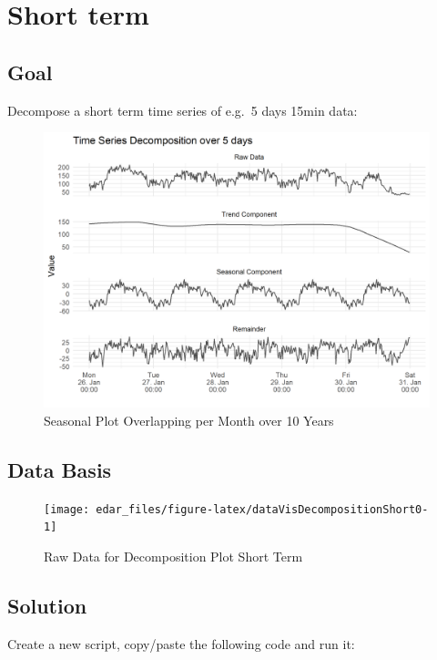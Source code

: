 \documentclass[
  a4paperpaper,
]{book}
\begin{document}
\newpage

\hypertarget{short-term}{%
\section{Short term}\label{short-term}}

\hypertarget{goal-5}{%
\subsection{Goal}\label{goal-5}}

Decompose a short term time series of e.g.~5 days 15min data:

\begin{figure}
\includegraphics[width=0.7\linewidth]{images/plotDecompositionShort} \caption{Seasonal Plot Overlapping per Month over 10 Years}\label{fig:unnamed-chunk-13}
\end{figure}

\hypertarget{data-basis-5}{%
\subsection{Data Basis}\label{data-basis-5}}

\begin{figure}
\texttt{[image: edar\_files/figure-latex/dataVisDecompositionShort0-1]} \caption{Raw Data for Decomposition Plot Short Term}\label{fig:dataVisDecompositionShort0}
\end{figure}

\newpage

\hypertarget{solution-5}{%
\subsection{Solution}\label{solution-5}}

Create a new script, copy/paste the following code and run it:
\end{document}
